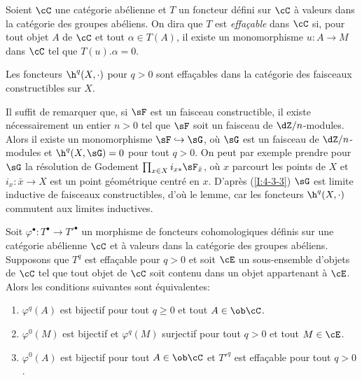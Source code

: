 \begin{definitiondotdash}\label{I:4-3-4}
Soient $\cC$ une catégorie abélienne et $T$ un foncteur défini sur $\cC$ 
à valeurs dans la catégorie des groupes abéliens. On dira que $T$ est 
\emph{effaçable} dans $\cC$ si, pour tout objet $A$ de $\cC$ et tout 
$\alpha\in T(A)$, il existe un monomorphisme $u:A\to M$ dans $\cC$ tel que 
$T(u).\alpha = 0$. 
\end{definitiondotdash}





\begin{lemmadotdash}\label{I:4-3-5}
Les foncteurs $\h^q(X,\cdot)$ pour $q>0$ sont effaçables dans la catégorie des 
faisceaux constructibles sur $X$.
\end{lemmadotdash}

Il suffit de remarquer que, si $\sF$ est un faisceau constructible, il existe 
nécessairement un entier $n>0$ tel que $\sF$ soit un faisceau de 
$\dZ/n$-modules. Alors il existe un monomorphisme $\sF\hookrightarrow \sG$, où 
$\sG$ est un faisceau de $\dZ/n$-modules et $\h^q(X,\sG) = 0$ pour tout $q>0$.  
On peut par exemple prendre pour $\sG$ la résolution de Godement 
$\prod_{x\in X} i_{x*} \sF_{\bar x}$, où $x$ parcourt les points de $X$ et 
$i_x:\bar x\to X$ est un point géométrique centré en $x$. D'après 
(\ref{I:4-3-3}) $\sG$ est limite inductive de faisceaux constructibles, d'où le 
lemme, car les foncteurs $\h^q(X,\cdot)$ commutent aux limites inductives. 





\begin{lemmadotdash}\label{I:4-3-6}
Soit $\varphi^\bullet:T^\bullet\to {T'}^\bullet$ un morphisme de foncteurs 
cohomologiques définis sur une catégorie abélienne $\cC$ et à valeurs 
dans la catégorie des groupes abéliens. Supposons que $T^q$ est effaçable 
pour $q>0$ et soit $\cE$ un sous-ensemble d'objets de $\cC$ tel que tout objet 
de $\cC$ soit contenu dans un objet appartenant à $\cE$. Alors les 
conditions suivantes sont équivalentes:
\begin{enumerate}[\indent (i)]
  \item $\varphi^q(A)$ est bijectif pour tout $q\geqslant 0$ et tout 
    $A\in\ob \cC$.
  \item $\varphi^0(M)$ est bijectif et $\varphi^q(M)$ surjectif pour tout 
    $q>0$ et tout $M\in\cE$. 
  \item $\varphi^0(A)$ est bijectif pour tout $A\in\ob \cC$ et ${T'}^q$ est 
    effaçable pour tout $q>0$. 
\end{enumerate}
\end{lemmadotdash}

